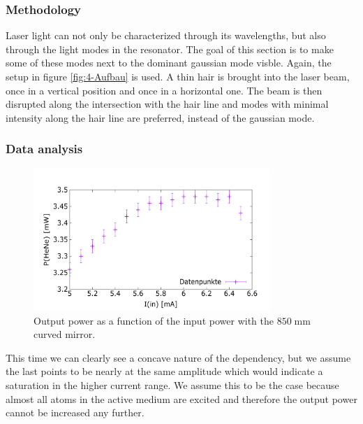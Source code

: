 \documentclass[../main.tex]{subfiles}
\begin{document}
\subsubsection*{Methodology}
    Laser light can not only be characterized through its wavelengths, but also through the light modes in the resonator. The goal of this section is to make some of these modes next to the dominant gaussian mode visble. Again, the setup in figure \ref{fig:4-Aufbau} is used. A thin hair is brought into the laser beam, once in a vertical position and once in a horizontal one. The beam is then disrupted along the intersection with the hair line and modes with minimal intensity along the hair line are preferred, instead of the gaussian mode.

\subsubsection*{Data analysis}

    \begin{figure}[H]
        \centering
        \includegraphics[width=0.8\textwidth]{Bilddateien/6/P(HeNe)overI(in).png}
        \caption{Output power as a function of the input power with the $850\;\si{\mm}$ curved mirror.}
        \label{fig:output_power_over_input_power_curved}
    \end{figure}

    This time we can clearly see a concave nature of the dependency, but we assume the last points to be nearly at the same amplitude which would indicate a saturation in the higher current range. We assume this to be the case because almost all atoms in the active medium are excited and therefore the output power cannot be increased any further. 
\end{document}
